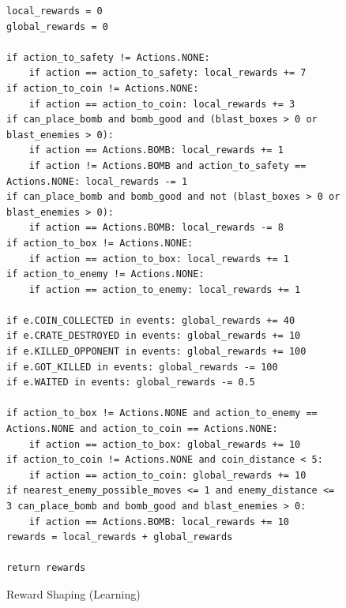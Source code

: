 \documentclass{article}
\begin{document}
\begin{figure}[H]
\centering
\begin{verbatim}
local_rewards = 0
global_rewards = 0

if action_to_safety != Actions.NONE:
    if action == action_to_safety: local_rewards += 7
if action_to_coin != Actions.NONE:
    if action == action_to_coin: local_rewards += 3
if can_place_bomb and bomb_good and (blast_boxes > 0 or blast_enemies > 0):
    if action == Actions.BOMB: local_rewards += 1
    if action != Actions.BOMB and action_to_safety == Actions.NONE: local_rewards -= 1
if can_place_bomb and bomb_good and not (blast_boxes > 0 or blast_enemies > 0):
    if action == Actions.BOMB: local_rewards -= 8
if action_to_box != Actions.NONE:
    if action == action_to_box: local_rewards += 1
if action_to_enemy != Actions.NONE:
    if action == action_to_enemy: local_rewards += 1

if e.COIN_COLLECTED in events: global_rewards += 40
if e.CRATE_DESTROYED in events: global_rewards += 10
if e.KILLED_OPPONENT in events: global_rewards += 100
if e.GOT_KILLED in events: global_rewards -= 100
if e.WAITED in events: global_rewards -= 0.5

if action_to_box != Actions.NONE and action_to_enemy == Actions.NONE and action_to_coin == Actions.NONE:
    if action == action_to_box: global_rewards += 10
if action_to_coin != Actions.NONE and coin_distance < 5:
    if action == action_to_coin: global_rewards += 10
if nearest_enemy_possible_moves <= 1 and enemy_distance <= 3 can_place_bomb and bomb_good and blast_enemies > 0:
    if action == Actions.BOMB: local_rewards += 10
rewards = local_rewards + global_rewards

return rewards
\end{verbatim}
\caption{Reward Shaping (Learning)}
\label{code:reward_shaping_2}
\end{figure}
\end{document}
